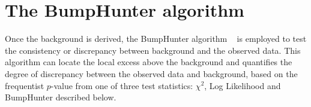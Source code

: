 \section{The BumpHunter algorithm}
\label{section: bumphunter}

Once the background is derived, the BumpHunter algorithm ~\cite{Aaltonen:2008vt,Choudalakis:2011bh} is employed to test the consistency or discrepancy between background and the observed data.
This algorithm can locate the local excess above the background and quantifies the degree of discrepancy between the observed data and background, based on the frequentist $p$-value from one of three test statistics: $\chi^{2}$, Log Likelihood and BumpHunter described below.

%
%


